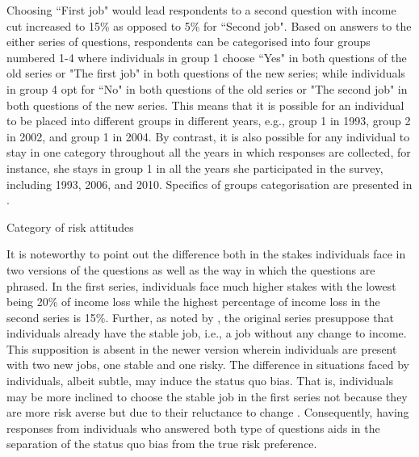 \documentclass[emulatestandardclasses, 10pt, abstract = true]{scrartcl}
\begin{document}
Choosing ``First job" would lead respondents to a second question with income cut increased to 15\% as opposed to 5\% for ``Second job". Based on answers to the either series of questions, respondents can be categorised into four groups numbered 1-4 where individuals in group 1 choose ``Yes" in both questions of the old series or "The first job" in both questions of the new series; while individuals in group 4 opt for ``No" in both questions of the old series or "The second job" in both questions of the new series. This means that it is possible for an individual to be placed into different groups in different years, e.g., group 1 in 1993, group 2 in 2002, and group 1 in 2004. By contrast, it is also possible for any individual to stay in one category throughout all the years in which responses are collected, for instance, she stays in group 1 in all the years she participated in the survey, including 1993, 2006, and 2010. Specifics of groups categorisation are presented in . 

\begin{table}[!t]
	\centering
	\setlength{\extrarowheight}{0.2em}
	\caption{Category of risk attitudes}	
	
	\label{table:risk-category}
\end{table}

It is noteworthy to point out the difference both in the stakes individuals face in two versions of the questions as well as the way in which the questions are phrased. In the first series, individuals face much higher stakes with the lowest being 20\% of income loss while the highest percentage of income loss in the second series is 15\%. Further, as noted by \citet{kimball2008imputing,kimball2009risk}, the original series presuppose that individuals already have the stable job, i.e., a job without any change to income. This supposition is absent in the newer version wherein individuals are present with two new jobs, one stable and one risky. The difference in situations faced by individuals, albeit subtle, may induce the status quo bias. That is, individuals may be more inclined to choose the stable job in the first series not because they are more risk averse but due to their reluctance to change \citep{samuelson1988status,tversky1991loss}. Consequently, having responses from individuals who answered both type of questions aids in the separation of the status quo bias from the true risk preference.
\end{document}
